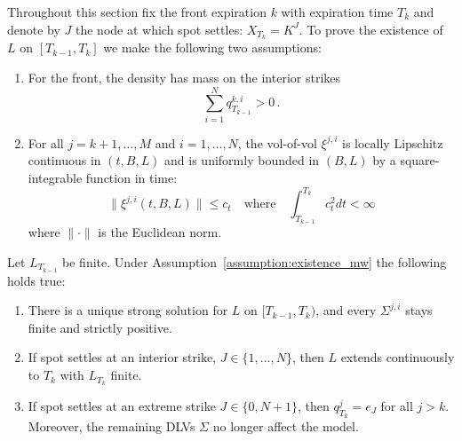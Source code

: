 \documentclass[smallextended,envcountsame,envcountsect]{svjour3}
\begin{document}
Throughout this section fix the front expiration $k$ with expiration time $T_k$ and denote by $J$ the node at which spot settles: $X_{T_k} = K^J$. To prove the existence of $L$ on $[T_{k-1}, T_k]$ we make the following two assumptions: 
\begin{assumption}
\label{assumption:existence_mw}
\begin{enumerate}[label=(\roman*)]
  \item For the front, the density has mass on the interior strikes
  $$\sum_{i=1}^N q_{T_{k-1}}^{k, i} > 0 \, .$$
  \item For all $j=k+1, \dots, M$ and $i=1, \dots, N$, the vol-of-vol $\xi^{j, i}$ is locally Lipschitz continuous in $(t, B, L)$ and is uniformly bounded in $(B, L)$ by a square-integrable function in time: 
  \begin{equation*}
    \|\xi^{j, i}(t, B, L)\| \leq c_t \quad \textrm{where} \quad \int_{T_{k-1}}^{T_k}c_t^2dt<\infty
  \end{equation*}
  where $\|\cdot\|$ is the Euclidean norm.
\end{enumerate}
\end{assumption}

\begin{theorem}[Existence]
\label{thm:existence_bh}
Let $L_{T_{k-1}} $ be finite. Under Assumption~\ref{assumption:existence_mw} the following holds true: 
\begin{enumerate}[label=(\roman*)]
  \item There is a unique strong solution for $L$ on $[T_{k-1},T_k)$, and every $\Sigma^{j,i}$ stays
    finite and strictly positive.
  \item If spot settles at an interior strike, $ J \in \lbrace 1, \dots, N \rbrace $, then $L$ extends continuously to $T_k$
    with $L_{T_k}$ finite.
  \item If spot settles at an extreme strike $ J \in \lbrace 0, N +1 \rbrace$, then $q^j_{T_k} = e_J$ for all $j > k$. Moreover, the remaining DLVs $\Sigma$ no longer affect the model. 
\end{enumerate}
\end{theorem}
\end{document}
